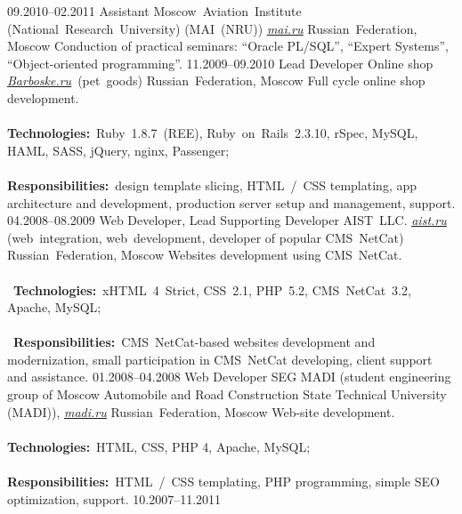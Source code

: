 \documentclass[12pt,a4paper,final]{moderncv}
\begin{document}
%
\cventry
{09.2010--02.2011}
{Assistant}
{Moscow~Aviation~Institute (National~Research~University) (MAI~(NRU)) \underline{\href{http://mai.ru}{\itshape mai.ru}}}
{Russian~Federation, Moscow}
{}
{
  Conduction of practical seminars: ``Oracle PL/SQL'', ``Expert Systems'', ``Object-oriented programming''.
}
%
\cventry
{11.2009--09.2010}
{Lead Developer}
{Online shop \underline{\href{http://barboske.ru}{\itshape Barboske.ru}}~(pet~goods)}
{Russian~Federation, Moscow}
{}
{
  Full cycle online shop development.
  \\\\
  \textbf{Technologies:}~Ruby~1.8.7~(REE), Ruby~on~Rails~2.3.10, rSpec, MySQL, HAML, SASS, jQuery, nginx, Passenger;
  \\\\
  \textbf{Responsibilities:}~design template slicing, HTML~/~CSS templating, app architecture and development, production server setup and management, support.
}
%
\cventry
{04.2008--08.2009}
{Web Developer, Lead Supporting Developer}
{
  AIST~LLC. \underline{\href{http://aist.ru}{\itshape aist.ru}} (web~integration, web~development, developer of popular CMS~NetCat)
}
{Russian~Federation, Moscow}
{}
{
Websites development using CMS~NetCat.\\\\\
\textbf{Technologies:}~xHTML~4~Strict, CSS~2.1, PHP~5.2, CMS~NetCat~3.2, Apache, MySQL;\\\\\
\textbf{Responsibilities:}~CMS~NetCat-based websites development and modernization, small participation in CMS~NetCat developing, client support and assistance.
}
%
\cventry
{01.2008--04.2008}
{Web Developer}
{
  SEG MADI (student engineering group of Moscow Automobile and Road Construction State Technical University (MADI)), \underline{\href{http://madi.ru}{\itshape madi.ru}}
}
{Russian~Federation, Moscow}
{}
{
  Web-site development.\\\\
  \textbf{Technologies:}~HTML, CSS, PHP 4, Apache, MySQL;\\\\
  \textbf{Responsibilities:}~HTML~/~CSS templating, PHP programming, simple SEO optimization, support.
}
%
\cventry
{10.2007--11.2011}
\end{document}
